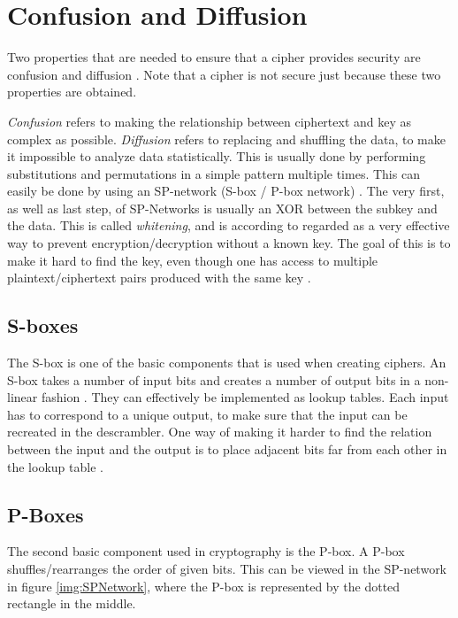 \section{Confusion and Diffusion}\label{ch:ConfDiff}
Two properties that are needed to ensure that a cipher provides security are 
confusion and diffusion \citep{Shannon:1949}. Note that a cipher is not secure 
just because these two properties are obtained.

\emph{Confusion} refers to making the relationship between ciphertext and key as 
complex as possible. \emph{Diffusion} refers to replacing and shuffling the 
data, to make it impossible to analyze data statistically. This is usually done 
by performing substitutions and permutations in a simple pattern multiple times. 
This can easily be done by using an SP-network (S-box / P-box network) 
\citep[pp. 74--79]{Stinson:2006}. The very first, as well as last step, of 
SP-Networks is usually an XOR between the subkey and the data. This is called 
\emph{whitening}, and is according to \citet[p. 75]{Stinson:2006} regarded as a 
very effective way to prevent encryption/decryption without a known key. 
The goal of this is to make it hard to find the key, even though one has access 
to multiple plaintext/ciphertext pairs produced with the same key 
\citep{Shannon:1949}.

\subsection{S-boxes}
The S-box is one of the basic components that is used when creating ciphers. 
An S-box takes a number of input bits and creates a number of output bits in 
a non-linear fashion \citep[pp. 74--75]{Stinson:2006}. They can effectively be 
implemented as lookup tables. Each input has to correspond to a unique output, 
to make sure that the input can be recreated in the descrambler. One way of 
making it harder to find the relation between the input and the output is to 
place adjacent bits far from each other in the lookup table
. 


\subsection{P-Boxes}
The second basic component used in cryptography is the P-box. A P-box 
shuffles/rearranges the order of given bits. This can be viewed in the 
SP-network in figure \ref{img:SPNetwork}, where the P-box is represented by the 
dotted rectangle in the middle.

